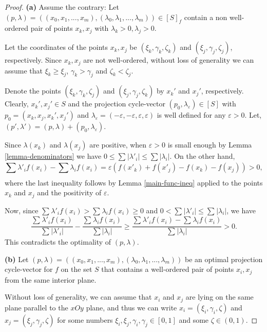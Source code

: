 \documentclass[10pt,a4paper]{amsart}
\begin{document}
\begin{proof}

\textbf{(a) }Assume the contrary: Let \((p,\lambda)=((x_0,x_1,...,x_m),(\lambda_0,\lambda_1,...,\lambda_m)) \in [S]_f\) contain a non well-ordered pair of points \(x_k,x_j\) with \(\lambda_k>0,\lambda_j>0\).
    
    Let the coordinates of the points \(x_k,x_j\) be \((\xi_k,\gamma_k,\zeta_k)\) and \((\xi_j,\gamma_j,\zeta_j)\), respectively. Since \(x_k,x_j\) are not well-ordered, without loss of generality we can assume that \(\xi_k \ge \xi_j\), \(\gamma_k > \gamma_j\) and \(\zeta_k < \zeta_j\).
    
    Denote the points \((\xi_k,\gamma_k,\zeta_j)\) and \((\xi_j,\gamma_j,\zeta_k)\) by \(x_k'\) and \(x_j'\), respectively.
    Clearly, \(x_k', x_j' \in S\) and the projection cycle-vector \((p_0,\lambda_\varepsilon) \in [S]\) with \(p_0=(x_k,x_j,x_k',x_j')\) and \(\lambda_\varepsilon=(-\varepsilon,-\varepsilon,\varepsilon,\varepsilon)\) is well defined for any \(\varepsilon>0\). Let, \((p',\lambda')=(p,\lambda)+(p_0,\lambda_\varepsilon)\).
    
   Since \(\lambda(x_k)\) and \(\lambda(x_j)\) are positive, when \(\varepsilon>0\) is small enough by Lemma \ref{lemma-denominators} we have \( 0 \le \sum_{}|\lambda'_i| \le  \sum|\lambda_i|\). On the other hand, 
     \[
     \sum_{}\lambda'_if(x_i)-\sum_{}\lambda_if(x_i)=\varepsilon(f(x'_k)+f(x'_j)-f(x_k)-f(x_j))>0,
     \]
where the last inequality follows by Lemma \ref{main-func-ineq} applied to the points \(x_k\) and \(x_j\) and the positivity of \(\varepsilon\).

Now, since \(\sum_{}\lambda'_if(x_i) > \sum_{}\lambda_if(x_i) \ge 0 \) and \( 0<\sum_{}|\lambda'_i| \le \sum_{}|\lambda_i|\), we have
     \[
    \frac{\sum_{}\lambda'_if(x_i)}{\sum_{}|\lambda'_i|}-\frac{\sum_{}\lambda_if(x_i)}{\sum|\lambda_i|} \ge \frac{\sum_{}\lambda'_if(x_i)-\sum_{}\lambda_if(x_i)}{\sum_{}|\lambda_i|}>0.
     \]
This contradicts the optimality of $(p,\lambda)$.

\textbf{(b)} 
    Let \((p,\lambda)=((x_0,x_1,...,x_m),(\lambda_0,\lambda_1,...,\lambda_m))\) be an optimal projection cycle-vector for \(f\) on the set \(S\) that contains a well-ordered pair of points \(x_i,x_j\) from the same interior plane.
    
    Without loss of generality, we can assume that \(x_i\) and \(x_j\) are lying on the same plane parallel to the \(xOy\) plane, and thus we can write \(x_i=(\xi_i,\gamma_i,\zeta)\) and \(x_j=(\xi_j,\gamma_j,\zeta)\) for some numbers \(\xi_i,\xi_j,\gamma_i,\gamma_j \in[0,1]\) and some \(\zeta \in (0,1)\). 
    

\end{proof}
\end{document}
